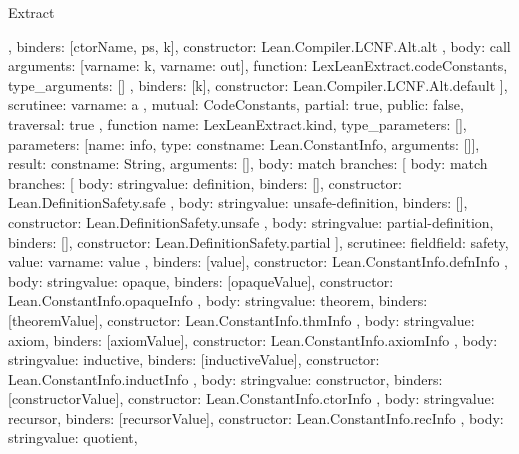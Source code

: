 \begin{lexlean}{Extract}
\begin{toolingmodule}
{{{{{            },
            binders: [ctorName, ps, k],
            constructor: Lean.Compiler.LCNF.Alt.alt
          },
          {
            body: call{
              arguments: [var{name: k}, var{name: out}],
              function: LexLeanExtract.codeConstants,
              type_arguments: []
            },
            binders: [k],
            constructor: Lean.Compiler.LCNF.Alt.default
          }
        ],
        scrutinee: var{name: a}
      },
      mutual: CodeConstants,
      partial: true,
      public: false,
      traversal: true
    },
    function{
      name: LexLeanExtract.kind,
      type_parameters: [],
      parameters: [{name: info, type: const{name: Lean.ConstantInfo, arguments: []}}],
      result: const{name: String, arguments: []},
      body: match{
        branches: [
          {
            body: match{
              branches: [
                {
                  body: string{value: definition},
                  binders: [],
                  constructor: Lean.DefinitionSafety.safe
                },
                {
                  body: string{value: unsafe-definition},
                  binders: [],
                  constructor: Lean.DefinitionSafety.unsafe
                },
                {
                  body: string{value: partial-definition},
                  binders: [],
                  constructor: Lean.DefinitionSafety.partial
                }
              ],
              scrutinee: field{field: safety, value: var{name: value}}
            },
            binders: [value],
            constructor: Lean.ConstantInfo.defnInfo
          },
          {
            body: string{value: opaque},
            binders: [opaqueValue],
            constructor: Lean.ConstantInfo.opaqueInfo
          },
          {
            body: string{value: theorem},
            binders: [theoremValue],
            constructor: Lean.ConstantInfo.thmInfo
          },
          {
            body: string{value: axiom},
            binders: [axiomValue],
            constructor: Lean.ConstantInfo.axiomInfo
          },
          {
            body: string{value: inductive},
            binders: [inductiveValue],
            constructor: Lean.ConstantInfo.inductInfo
          },
          {
            body: string{value: constructor},
            binders: [constructorValue],
            constructor: Lean.ConstantInfo.ctorInfo
          },
          {
            body: string{value: recursor},
            binders: [recursorValue],
            constructor: Lean.ConstantInfo.recInfo
          },
          {
            body: string{value: quotient},
}}}}
\end{toolingmodule}
\end{lexlean}
